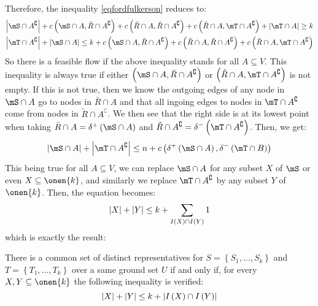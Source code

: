 \documentclass[math]{cours}
\def\bR{\bar{R}}
\def\tR{\tilde{R}}
\def\Ac{A^{\complement}}
\begin{document}
Therefore, the inequality \ref{eqfordfulkerson} reduces to:
\begin{align*}
	\abs{\mS \cap \Ac} + c\left(\mS\cap A, \bR\cap \Ac \right) + c\left(\bR\cap A, \tR\cap \Ac \right) + c\left( \tR\cap A, \mT\cap \Ac \right) + \abs{\mT \cap A} \geq k\\
	\abs{\mT \cap \Ac} + \abs{\mS\cap A} \leq k + c\left(\mS \cap A, \bR\cap\Ac \right) + c\left(\bR \cap A, \tR\cap \Ac \right) + c\left(\tR\cap A, \mT\cap\Ac \right)
\end{align*}
So there is a feasible flow if the above inequality stands for all $A \subseteq V$.
This inequality is always true if either $\left(\mS\cap A, \bR\cap \Ac \right)$ or $\left(\tR\cap A, \mT\cap \Ac \right)$ is not empty.
If this is not true, then we know the outgoing edges of any node in $\mS \cap A$ go to nodes in $\bR \cap A$ and that all ingoing edges to nodes in $\mT\cap \Ac$ come from nodes in $\tR\cap\Ac$.
We then see that the right side is at its lowest point when taking $\bR \cap A = \delta^{+}\left(\mS \cap A\right)$ and $\tR\cap \Ac = \delta^{-}\left( \mT\cap \Ac \right)$.
Then, we get:
\begin{equation*}
	\abs{\mS \cap A} + \abs{\mT\cap \Ac} \leq n + c\left(\delta^{+}\left(\mS\cap A \right), \delta^{-}\left( \mT\cap B \right) \right)
\end{equation*}
This being true for all $A \subseteq V$, we can replace $\mS\cap A$ for any subset $X$ of $\mS$ or even $X \subseteq \onen{k}$, and similarly we replace $\mT\cap \Ac$ by any subset $Y$ of $\onen{k}$.
Then, the equation becomes:
\begin{equation*}
	\left|X\right| + \left|Y\right| \leq k + \sum_{I\left(X\right) \cap I\left(Y\right)} 1
\end{equation*}
which is exactly the result:
\begin{thm}
There is a common set of distinct representatives for $S = \left\{S_{1}, \ldots, S_{k} \right\}$ and $T = \left\{T_{1}, \ldots, T_{k} \right\}$ over a same ground set $U$ if and only if, for every $X, Y \subseteq \onen{k}$ the following inequality is verified:
\begin{equation*}
	\left|X\right| + \left|Y\right| \leq k + \left|I\left(X\right) \cap I\left(Y\right)\right|
\end{equation*}
\end{thm}
\end{document}

